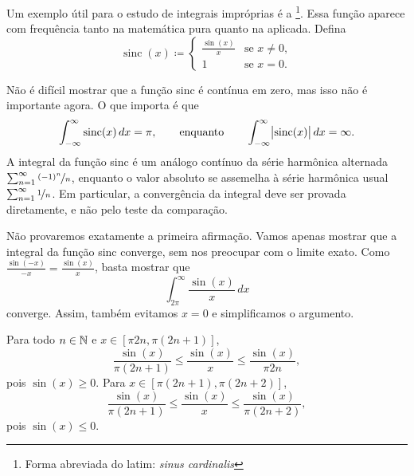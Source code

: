 \begin{example}
Um exemplo útil para o estudo de integrais impróprias é a
\emph{}%
\footnote{Forma abreviada do latim: \emph{sinus cardinalis}}.
Essa função aparece com frequência tanto na matemática pura
quanto na aplicada. Defina
\begin{equation*}
\operatorname{sinc}(x) \coloneqq
\begin{cases}
\frac{\sin(x)}{x} & \text{se } x \neq 0 , \\
1 & \text{se } x = 0 .
\end{cases}
\end{equation*}
\begin{myfigureht}
\caption{A função sinc.\label{figsinc}}
\end{myfigureht}

Não é difícil mostrar que
a função sinc é contínua em zero, mas isso não é importante agora.
O que importa é que
\begin{equation*}
\int_{-\infty}^\infty \operatorname{sinc}(x) \,dx = \pi ,
\qquad \text{enquanto} \qquad
\int_{-\infty}^\infty \bigl\lvert {\operatorname{sinc}(x)} \bigr\rvert \,dx = \infty .
\end{equation*}
A integral da função sinc é um análogo contínuo da série harmônica alternada
$\sum_{n=1}^\infty \nicefrac{{(-1)}^n}{n}$, enquanto o valor absoluto se
assemelha à série harmônica usual $\sum_{n=1}^\infty \nicefrac{1}{n}$.
Em particular, a convergência da integral deve ser provada diretamente,
e não pelo teste da comparação.

Não provaremos exatamente a primeira afirmação. Vamos apenas mostrar
que a integral da função sinc converge, sem nos preocupar com o limite
exato. Como $\frac{\sin(-x)}{-x} = \frac{\sin(x)}{x}$, basta mostrar que
\begin{equation*}
\int_{2\pi}^\infty \frac{\sin(x)}{x}\,dx
\end{equation*}
converge. Assim,
também evitamos $x=0$ e simplificamos o argumento.

Para todo $n \in {\mathbb{N}}$ e $x \in [\pi 2n, \pi (2n+1)]$,
\begin{equation*}
\frac{\sin(x)}{\pi (2n+1)}
\leq
\frac{\sin(x)}{x}
\leq
\frac{\sin(x)}{\pi 2n} ,
\end{equation*}
pois $\sin(x) \geq 0$. Para $x \in [\pi (2n+1), \pi (2n+2)]$,
\begin{equation*}
\frac{\sin(x)}{\pi (2n+1)}
\leq
\frac{\sin(x)}{x}
\leq
\frac{\sin(x)}{\pi (2n+2)} ,
\end{equation*}
pois $\sin(x) \leq 0$.


\end{example}
